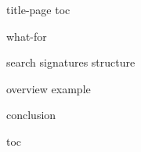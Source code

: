 \documentclass[
    unicode,
    10pt,
    compress,
    hyperref={xetex}
]{beamer}
\title[\thetitlemod]{\mtitle}
\author{\theauthormod}
\date{\today}
\begin{document}
    {title-page} %
    {toc} %


    {what-for}    %


    {search}      %
    {signatures}      %
    {structure}      %

    {overview}    %
    {example}   %




    {conclusion}   %


    {toc} %
\end{document}
